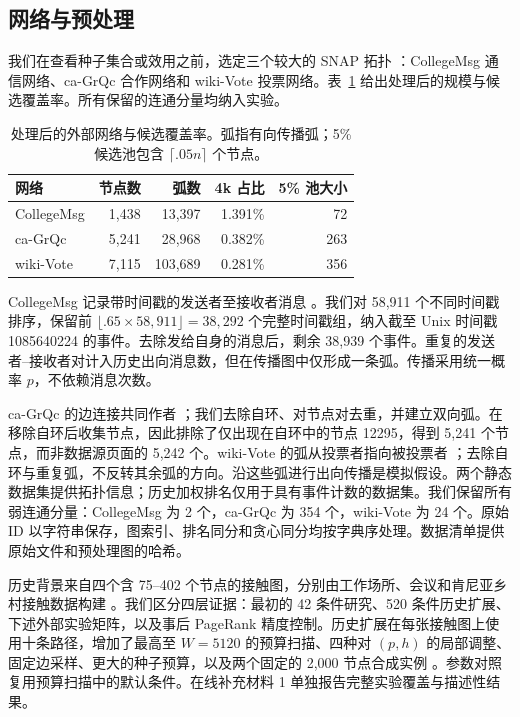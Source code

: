 \documentclass[smallextended]{svjour3}
\begin{document}
\subsection{网络与预处理}
我们在查看种子集合或效用之前，选定三个较大的 SNAP 拓扑 \cite{snap}：CollegeMsg 通信网络、ca-GrQc 合作网络和 wiki-Vote 投票网络。表~\ref{tab:data} 给出处理后的规模与候选覆盖率。所有保留的连通分量均纳入实验。
\begin{table}[htbp]
\caption{处理后的外部网络与候选覆盖率。弧指有向传播弧；5\% 候选池包含 $\lceil .05n\rceil$ 个节点。}\label{tab:data}
\begin{tabular}{lrrrr}
\toprule
网络 & 节点数 & 弧数 & 4k 占比 & 5\% 池大小 \\
\midrule
CollegeMsg & 1,438 & 13,397 & 1.391\% & 72 \\
ca-GrQc & 5,241 & 28,968 & 0.382\% & 263 \\
wiki-Vote & 7,115 & 103,689 & 0.281\% & 356 \\
\bottomrule
\end{tabular}
\end{table}

CollegeMsg 记录带时间戳的发送者至接收者消息 \cite{college}。我们对 58,911 个不同时间戳排序，保留前 $\lfloor .65\times58,911\rfloor=38,292$ 个完整时间戳组，纳入截至 Unix 时间戳 1085640224 的事件。去除发给自身的消息后，剩余 38,939 个事件。重复的发送者--接收者对计入历史出向消息数，但在传播图中仅形成一条弧。传播采用统一概率 $p$，不依赖消息次数。

ca-GrQc 的边连接共同作者 \cite{grqc}；我们去除自环、对节点对去重，并建立双向弧。在移除自环后收集节点，因此排除了仅出现在自环中的节点 12295，得到 5,241 个节点，而非数据源页面的 5,242 个。wiki-Vote 的弧从投票者指向被投票者 \cite{signed,links}；去除自环与重复弧，不反转其余弧的方向。沿这些弧进行出向传播是模拟假设。两个静态数据集提供拓扑信息；历史加权排名仅用于具有事件计数的数据集。我们保留所有弱连通分量：CollegeMsg 为 2 个，ca-GrQc 为 354 个，wiki-Vote 为 24 个。原始 ID 以字符串保存，图索引、排名同分和贪心同分均按字典序处理。数据清单提供原始文件和预处理图的哈希。

历史背景来自四个含 75--402 个节点的接触图，分别由工作场所、会议和肯尼亚乡村接触数据构建 \cite{ref3,ref4,ref5,ref6}。我们区分四层证据：最初的 42 条件研究、520 条件历史扩展、下述外部实验矩阵，以及事后 PageRank 精度控制。历史扩展在每张接触图上使用十条路径，增加了最高至 $W=5120$ 的预算扫描、四种对 $(p,h)$ 的局部调整、固定边采样、更大的种子预算，以及两个固定的 2,000 节点合成实例 \cite{ref17,ref18}。参数对照复用预算扫描中的默认条件。在线补充材料 1 单独报告完整实验覆盖与描述性结果。
\end{document}
